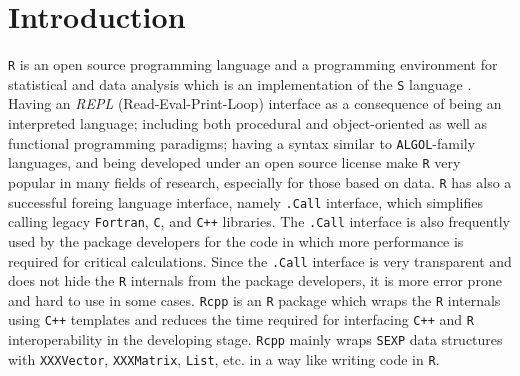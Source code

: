 \documentclass[10pt,a4paper, final, oneside]{article}
\begin{document}
\section{Introduction}
\label{Introduction}
\texttt{R} is an open source programming language and a programming environment for statistical and data analysis \cite{R} which is an implementation of the \texttt{S} language \cite{SLang}. Having an \emph{REPL} (Read-Eval-Print-Loop) interface as a consequence of being an interpreted language; including both procedural and object-oriented as well as functional programming paradigms; having a syntax similar to \texttt{ALGOL}-family languages, and being developed under an open source license make \texttt{R} very popular in many fields of research, especially for those based on data. \texttt{R} has also a successful foreing language interface, namely \texttt{.Call} interface, which simplifies calling legacy \texttt{Fortran}, \texttt{C}, and \texttt{C++} libraries. The \texttt{.Call} interface is also frequently used by the package developers for the code in which more performance is required for critical calculations. Since the \texttt{.Call} interface is very transparent and does not hide the \texttt{R} internals from the package developers, it is more error prone and hard to use in some cases. \texttt{Rcpp} is an \texttt{R} package which wraps the \texttt{R} internals using \texttt{C++} templates and reduces the time required for interfacing \texttt{C++} and \texttt{R} interoperability \cite{eddelbuettel2011rcpp, eddelbuettel2013seamless} in the developing stage. \texttt{Rcpp} mainly wraps \texttt{SEXP} data structures with \texttt{XXXVector}, \texttt{XXXMatrix}, \texttt{List}, etc. in a way like writing code in \texttt{R}. 
\end{document}
